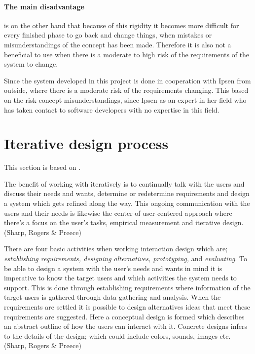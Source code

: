 \paragraph{The main disadvantage} is on the other hand that because of this rigidity it becomes more difficult for every finished phase to go back and change things, when mistakes or misunderstandings of the concept has been made.
Therefore it is also not a beneficial to use when there is a moderate to high risk of the requirements of the system to change.

Since the system developed in this project is done in cooperation with Ipsen from outside, where there is a moderate risk of the requirements changing.
This based on the risk concept misunderstandings, since Ipsen as an expert in her field who has taken contact to software developers with no expertise in this field.



\section{Iterative design process} \label{sec:iterativ}
This section is based on \cite{InteractionDesign}.

The benefit of working with iteratively is to continually talk with the users and discuss their needs and wants, determine or redetermine requirements and design a system which gets refined along the way. This ongoing communication with the users and their needs is likewise the center of user-centered approach where there’s a focus on the user’s tasks, empirical measurement and iterative design. (Sharp, Rogers \& Preece)

There are four basic activities when working interaction design which are; \textit{establishing requirements, designing alternatives, prototyping,} and \textit{evaluating}. To be able to design a system with the user’s needs and wants in mind it is imperative to know the target users and which activities the system needs to support. This is done through establishing requirements where information of the target users is gathered through data gathering and analysis. When the requirements are settled it is possible to design alternatives ideas that meet these requirements are suggested. Here a conceptual design is formed which describes an abstract outline of how the users can interact with it. Concrete designs infers to the details of the design; which could include colors, sounds, images etc. (Sharp, Rogers \& Preece)

